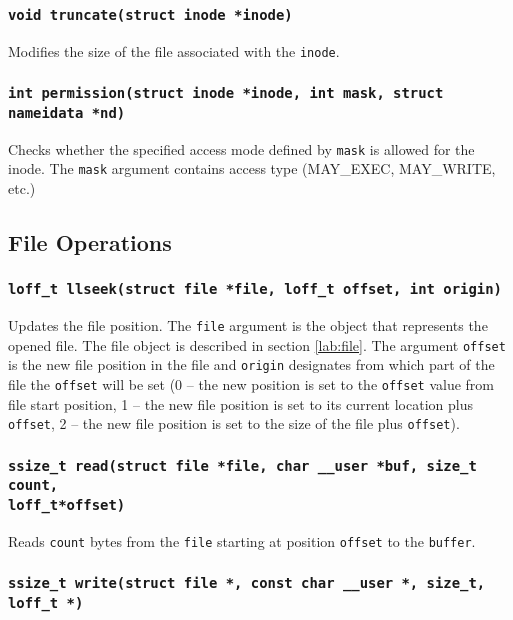 \subsubsection{\texttt{void truncate(struct inode *inode)}}

Modifies the size of the file associated with the \texttt{inode}.


\subsubsection{\texttt{int permission(struct inode *inode, int mask, struct nameidata
*nd)}}

Checks whether the specified access mode defined by \texttt{mask} is allowed for the
inode. The \texttt{mask} argument contains access type (MAY\_EXEC, MAY\_WRITE, etc.)

\subsection{File Operations}

\subsubsection{\texttt{loff\_t llseek(struct file *file, loff\_t offset, int origin)}}

Updates the file position. The \texttt{file} argument is the object that represents the opened
file. The file object is described in section \ref{lab:file}. The argument \texttt{offset} is
the new file position in the file and \texttt{origin} designates from which part of the file
the \texttt{offset} will be set (0 -- the new position is set to the \texttt{offset} value
from file start position, 1 -- the new file position is set to its current location
plus \texttt{offset}, 2 -- the new file position is set to the size of the file plus
\texttt{offset}). 

\subsubsection{\texttt{ssize\_t read(struct file *file, char \_\_user *buf, size\_t
count,\\loff\_t*offset)}}

Reads \texttt{count} bytes from the \texttt{file} starting at position \texttt{offset} to
the \texttt{buffer}.

\subsubsection{\texttt{ssize\_t write(struct file *, const char \_\_user *, size\_t,
loff\_t *)}}

